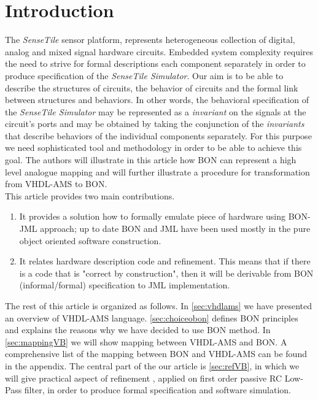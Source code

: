 \documentclass{article}
\newcommand{\ST}{\emph{SenseTile}\xspace}
\newcommand{\STS}{\emph{SenseTile Simulator}\xspace}
\newcommand{\inv}{\emph{invariant}\xspace}
\begin{document}
\section{Introduction}
\label{sec:introduction}
The \ST sensor platform, represents heterogeneous collection of digital, analog
and mixed signal hardware circuits. Embedded system complexity
requires the need to strive for formal descriptions each component
separately in order to produce specification of the \STS.
Our aim is to be able to describe the structures of circuits,
the behavior of circuits and the formal link between structures and behaviors.
In other words, the behavioral specification of the \STS may be
represented as a \inv on the signals at the circuit's ports and may be obtained
by taking the conjunction of the \emph{invariants} that describe
behaviors of the individual components separately.
For this purpose we need  sophisticated tool and methodology
in order to be able to achieve this goal. 
The authors will illustrate in this article how BON can represent a high
level analogue mapping and will further illustrate a procedure for
transformation from VHDL-AMS to BON.\\
This article provides two main contributions.
\begin{enumerate}
\item
 It provides a solution how to formally emulate
 piece of hardware using BON-JML approach; up to date BON and JML
 have been used mostly in the pure object oriented software construction.   
\item
It relates hardware description code and refinement.
This means that if there  is a code that is "correct by construction",
then it will be derivable from BON (informal/formal) specification to 
JML implementation.
\end{enumerate}
The rest of this article is organized as follows.
In \autoref{sec:vhdlams} we have  presented an overview of VHDL-AMS language.
\autoref{sec:choiceobon} defines  BON principles and explains the
reasons why we have decided to use BON method.
In \autoref{sec:mappingVB} we will show mapping between VHDL-AMS and BON.
A comprehensive list of the mapping between BON and VHDL-AMS can be
found in the appendix. 
The central part of the our article is \autoref{sec:refVB}, in which
we will give practical aspect of refinement , applied on 
first order passive RC Low-Pass filter, in order to produce formal 
specification and software simulation.\\ 
\end{document}
